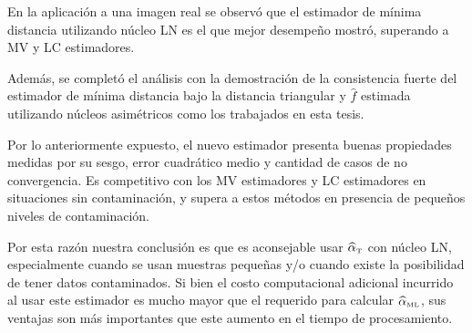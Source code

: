 En la aplicación a una imagen real se observó que el estimador de mínima distancia utilizando núcleo LN es el que mejor desempeño mostró, superando a MV y LC estimadores.

Además, se completó el análisis con la demostración de la consistencia fuerte del estimador de mínima distancia bajo la distancia triangular y $\widehat{f}$ estimada utilizando núcleos asimétricos como los trabajados en esta tesis.

Por lo anteriormente expuesto, el nuevo estimador presenta buenas propiedades medidas por su sesgo, error cuadrático medio y cantidad de casos de no convergencia. Es competitivo con los MV estimadores y LC estimadores en situaciones sin contaminación, y supera a estos métodos en presencia de pequeños niveles de contaminación.

Por esta razón nuestra conclusión es que es aconsejable usar $\widehat{\alpha}_{\text{\tiny{T}}} $ con núcleo LN, especialmente cuando se usan muestras pequeñas y/o cuando existe la posibilidad de tener datos contaminados. Si bien el costo computacional adicional incurrido al usar este estimador es mucho mayor que el requerido para calcular $\widehat{\alpha}_{\text{\tiny{ML}}}$, sus ventajas son más importantes que este aumento en el tiempo de procesamiento.